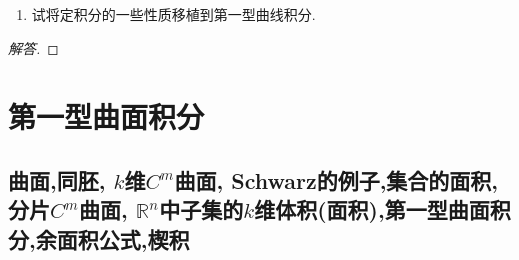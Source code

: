 \begin{quizb}
\begin{enumerate}
\item 试将定积分的一些性质移植到第一型曲线积分.
\end{enumerate}
\begin{proof}[解答]

\end{proof}
\end{quizb}

\section{第一型曲面积分}
\subsection{曲面,同胚, \(k\)维\(C^m\)曲面, Schwarz的例子,集合的面积,分片\(C^m\)曲面, \(\mathbb{R}^n\)中子集的\(k\)维体积(面积),第一型曲面积分,余面积公式,楔积}
